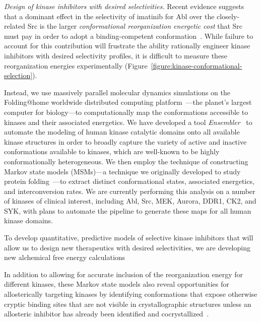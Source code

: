 \documentclass[10pt]{article}
\begin{document}
\emph{Design of kinase inhibitors with desired selectivities.}
Recent evidence suggests that a dominant effect in the selectivity of imatinib for Abl over the closely-related Src is the larger \emph{conformational reorganization energetic cost} that Src must pay in order to adopt a binding-competent conformation~\cite{seeliger:2007:structure:imatinib-binding,simonson:j-biol-chem:2010:imatinib-selectivity,roux:pnas:2013:gleevec-selectivity}.
While failure to account for this contribution will frustrate the ability rationally engineer kinase inhibitors with desired selectivity profiles, it is difficult to measure these reorganization energies experimentally (Figure~\ref{figure:kinase-conformational-selection}).

Instead, we use massively parallel molecular dynamics simulations on the Folding@home worldwide distributed computing platform~\cite{shirts-pande:science:2000:folding-at-home}---the planet's largest computer for biology---to computationally map the conformations accessible to kinases and their associated energetics.
We have developed a tool \emph{Ensembler}~\cite{ensembler} to automate the modeling of human kinase catalytic domains onto all available kinase structures in order to broadly capture the variety of active and inactive conformations available to kinases, which are well-known to be highly conformationally heterogeneous. 
We then employ the technique of constructing Markov state models (MSMs)---a technique we originally developed to study protein folding~\cite{chodera:2006:mms:long-time-dynamics,chodera:jcp:2007,noe:jcp:2011:msm-review}---to extract distinct conformational states, associated energetics, and interconversion rates.
We are currently performing this analysis on a number of kinases of clinical interest, including Abl, Src, MEK, Aurora, DDR1, CK2, and SYK, with plans to automate the pipeline to generate these maps for all human kinase domains.

To develop quantitative, predictive models of selective kinase inhibitors that will allow us to design new therapeutics with desired selectivities, we are developing new alchemical free energy calculations

In addition to allowing for accurate inclusion of the reorganization energy for different kinases, these Markov state models also reveal opportunities for allosterically targeting kinases by identifying conformations that expose otherwise cryptic binding sites that are not visible in crystallographic structures unless an allosteric inhibitor has already been identified and cocrystallized~\cite{bowman-geissler:pnas:2012:cryptic-allosteric-sites}.
\end{document}
